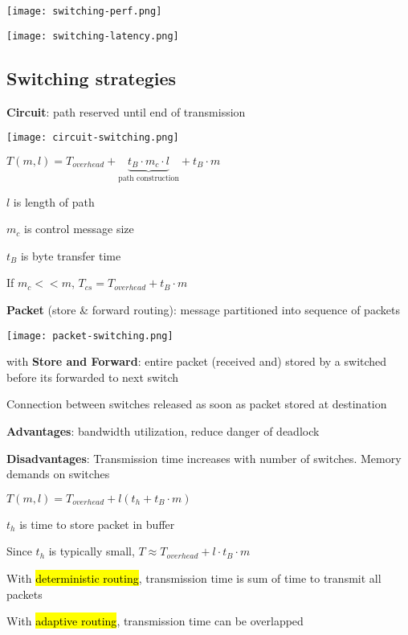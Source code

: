 \documentclass[12pt]{article}
\begin{document}
\begin{spacing}{1.5}
\texttt{[image: switching-perf.png]}

\texttt{[image: switching-latency.png]}

\subsection{Switching strategies}

\begin{itemize*}
	\item \textbf{Circuit}: path reserved until end of transmission
		
		\vspace{0.2cm}
		\texttt{[image: circuit-switching.png]}
		
		\begin{itemize*}
			\item $T(m, l) = T_{overhead} + \underbrace{t_B \cdot m_c \cdot l}_{\text{path construction}} + t_B \cdot m$
			\item $l$ is length of path
			\item $m_c$ is control message size
			\item $t_B$ is byte transfer time
			\item If $m_c << m$, $T_{cs} = T_{overhead} + t_B \cdot m$
		\end{itemize*}
	
	\item \textbf{Packet} (store \& forward routing): message partitioned into sequence of packets
	
		\vspace{0.2cm}
		\texttt{[image: packet-switching.png]}
		
		\begin{itemize*}
		\item with \textbf{Store and Forward}: entire packet (received and) stored by a switched before its forwarded to next switch
		\item Connection between switches released as soon as packet stored at destination
		\item \textbf{Advantages}: bandwidth utilization, reduce danger of deadlock
		\item \textbf{Disadvantages}: Transmission time increases with number of switches. Memory demands on switches
		\item $T(m, l) = T_{overhead} + l(t_h + t_B \cdot m)$
		\item $t_h$ is time to store packet in buffer
		\item Since $t_h$ is typically small, $T \approx T_{overhead} + l \cdot t_B \cdot m$
		\item With \hl{deterministic routing}, transmission time is sum of time to transmit all packets
		\item With \hl{adaptive routing}, transmission time can be overlapped
		\end{itemize*}
		

\end{itemize*}
\end{spacing}
\end{document}
